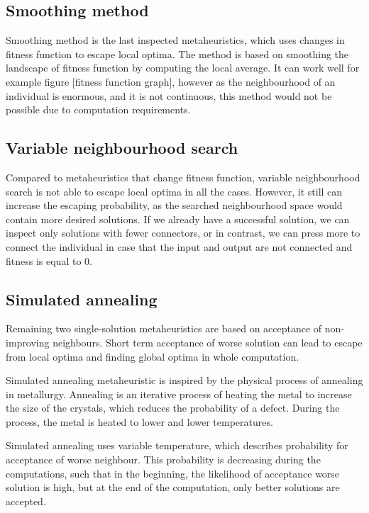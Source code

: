 \documentclass[
  print, %
  Table,   %
  nolof,     %
  nolot,     %
  11pt, %
  oneside  %
]{fithesis3}
\begin{document}
\subsection{Smoothing method}
\label{subsec:opt-single-sol-smooth}

Smoothing method is the last inspected metaheuristics, which uses changes in fitness function to escape local optima. The method is based on smoothing the landscape of fitness function by computing the local average. It can work well for example figure [fitness function graph], however as the neighbourhood of an individual is enormous, and it is not continuous, this method would not be possible due to computation requirements.

\subsection{Variable neighbourhood search}
\label{subsec:opt-single-sol-vns}

Compared to metaheuristics that change fitness function, variable neighbourhood search is not able to escape local optima in all the cases. However, it still can increase the escaping probability, as the searched neighbourhood space would contain more desired solutions. If we already have a successful solution, we can inspect only solutions with fewer connectors, or in contrast, we can press more to connect the individual in case that the input and output are not connected and fitness is equal to 0.

\subsection{Simulated annealing}
\label{subsec:opt-single-sol-sa}

Remaining two single-solution metaheuristics are based on acceptance of non-improving neighbours. Short term acceptance of worse solution can lead to escape from local optima and finding global optima in whole computation.

Simulated annealing metaheuristic is inspired by the physical process of annealing in metallurgy. Annealing is an iterative process of heating the metal to increase the size of the crystals, which reduces the probability of a defect. During the process, the metal is heated to lower and lower temperatures.

Simulated annealing uses variable temperature, which describes probability for acceptance of worse neighbour. This probability is decreasing during the computations, such that in the beginning, the likelihood of acceptance worse solution is high, but at the end of the computation, only better solutions are accepted.
\end{document}
